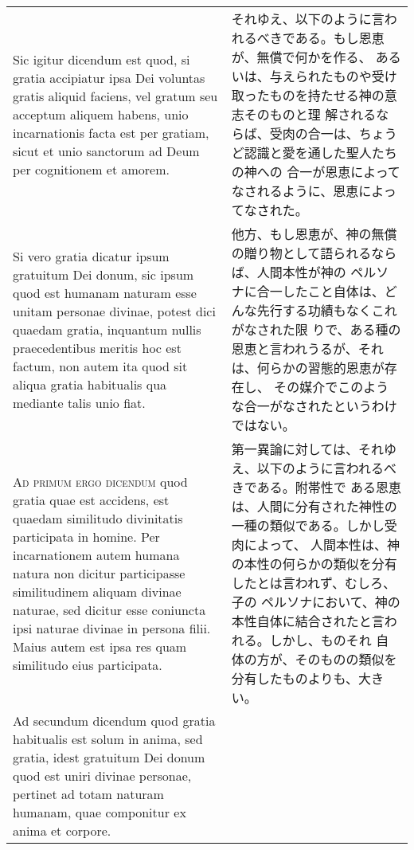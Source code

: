 \documentclass[10pt]{jsarticle} %
\begin{document}
\begin{longtable}{p{21em}p{21em}}
\\


Sic igitur dicendum est quod, si gratia accipiatur ipsa Dei voluntas
gratis aliquid faciens, vel gratum seu acceptum aliquem habens, unio
incarnationis facta est per gratiam, sicut et unio sanctorum ad Deum
per cognitionem et amorem.

&

それゆえ、以下のように言われるべきである。もし恩恵が、無償で何かを作る、
あるいは、与えられたものや受け取ったものを持たせる神の意志そのものと理
解されるならば、受肉の合一は、ちょうど認識と愛を通した聖人たちの神への
合一が恩恵によってなされるように、恩恵によってなされた。


\\

Si vero gratia dicatur ipsum gratuitum Dei donum, sic ipsum quod est
humanam naturam esse unitam personae divinae, potest dici quaedam
gratia, inquantum nullis praecedentibus meritis hoc est factum, non
autem ita quod sit aliqua gratia habitualis qua mediante talis unio
fiat.

&

他方、もし恩恵が、神の無償の贈り物として語られるならば、人間本性が神の
ペルソナに合一したこと自体は、どんな先行する功績もなくこれがなされた限
りで、ある種の恩恵と言われうるが、それは、何らかの習態的恩恵が存在し、
その媒介でこのような合一がなされたというわけではない。

\\



{\scshape Ad primum ergo dicendum} quod gratia quae est accidens, est
quaedam similitudo divinitatis participata in homine. Per
incarnationem autem humana natura non dicitur participasse
similitudinem aliquam divinae naturae, sed dicitur esse coniuncta ipsi
naturae divinae in persona filii. Maius autem est ipsa res quam
similitudo eius participata.

&

第一異論に対しては、それゆえ、以下のように言われるべきである。附帯性で
ある恩恵は、人間に分有された神性の一種の類似である。しかし受肉によって、
人間本性は、神の本性の何らかの類似を分有したとは言われず、むしろ、子の
ペルソナにおいて、神の本性自体に結合されたと言われる。しかし、ものそれ
自体の方が、そのものの類似を分有したものよりも、大きい。

\\



Ad secundum dicendum quod gratia habitualis est solum in anima, sed
gratia, idest gratuitum Dei donum quod est uniri divinae personae,
pertinet ad totam naturam humanam, quae componitur ex anima et
corpore.


\end{longtable}
\end{document}
